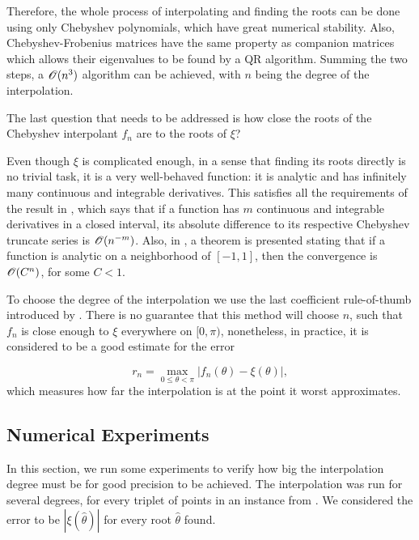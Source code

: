 Therefore, the whole process of interpolating and finding the roots can be done using only Chebyshev polynomials, which have great numerical stability. Also, Chebyshev-Frobenius matrices have the same property as companion matrices which allows their eigenvalues to be found by a QR algorithm. Summing the two steps, a $\mathscr{O}(n^3)$ algorithm can be achieved, with $n$ being the degree of the interpolation.

The last question that needs to be addressed is how close the roots of the Chebyshev interpolant $f_n$ are to the roots of $\xi$?

Even though $\xi$ is complicated enough, in a sense that finding its roots directly is no trivial task, it is a very well-behaved function: it is analytic and has infinitely many continuous and integrable derivatives. This satisfies all the requirements of the result in , which says that if a function has $m$ continuous and integrable derivatives in a closed interval, its absolute difference to its respective Chebyshev truncate series is $\mathscr{O}(n^{-m})$. Also, in , a theorem is presented stating that if a function is analytic on a neighborhood of $[-1, 1]$, then the convergence is $\mathscr{O}(C^n)$, for some $C<1$.

To choose the degree of the interpolation we use the last coefficient rule-of-thumb introduced by . There is no guarantee that this method will choose $n$, such that $f_n$ is close enough to $\xi$ everywhere on $[0, \pi)$, nonetheless, in practice, it is considered to be a good estimate for the error

\begin{equation}
r_n = \max_{0 \le \theta < \pi} |f_n(\theta) - \xi(\theta)|,
\end{equation}
which measures how far the interpolation is at the point it worst approximates. 

\subsection{Numerical Experiments}

In this section, we run some experiments to verify how big the interpolation degree must be for good precision to be achieved. 
The interpolation was run for several degrees, for every triplet of points in an instance from . We considered the error to be $|\xi(\hat{\theta})|$ for every root $\hat{\theta}$ found.

